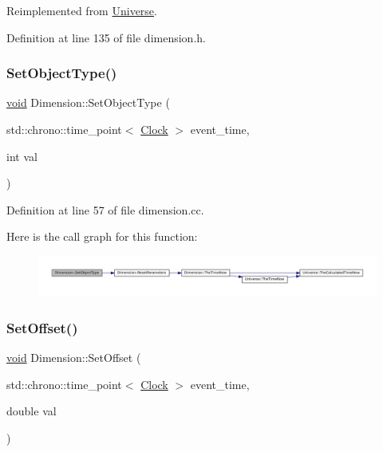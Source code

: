 Reimplemented from \mbox{\hyperlink{class_universe_ae0cb8d86b2fbb8396d605160344b42f5}{Universe}}.



Definition at line 135 of file dimension.\+h.

\mbox{\label{class_dimension_a484621a7c6f9b43f6e251ba04e0fdf8b}} 
\subsubsection{\texorpdfstring{Set\+Object\+Type()}{SetObjectType()}}
{\footnotesize\ttfamily \mbox{\hyperlink{glad_8h_a950fc91edb4504f62f1c577bf4727c29}{void}} Dimension\+::\+Set\+Object\+Type (\begin{DoxyParamCaption}\item[{std\+::chrono\+::time\+\_\+point$<$ \mbox{\hyperlink{universe_8h_a0ef8d951d1ca5ab3cfaf7ab4c7a6fd80}{Clock}} $>$}]{event\+\_\+time,  }\item[{int}]{val }\end{DoxyParamCaption})}



Definition at line 57 of file dimension.\+cc.

Here is the call graph for this function\+:\nopagebreak
\begin{figure}[H]
\begin{center}
\leavevmode
\includegraphics[width=350pt]{class_dimension_a484621a7c6f9b43f6e251ba04e0fdf8b_cgraph}
\end{center}
\end{figure}
\mbox{\label{class_dimension_af74dd7af3af95c0a51b001b6ad665300}} 
\subsubsection{\texorpdfstring{Set\+Offset()}{SetOffset()}}
{\footnotesize\ttfamily \mbox{\hyperlink{glad_8h_a950fc91edb4504f62f1c577bf4727c29}{void}} Dimension\+::\+Set\+Offset (\begin{DoxyParamCaption}\item[{std\+::chrono\+::time\+\_\+point$<$ \mbox{\hyperlink{universe_8h_a0ef8d951d1ca5ab3cfaf7ab4c7a6fd80}{Clock}} $>$}]{event\+\_\+time,  }\item[{double}]{val }\end{DoxyParamCaption})}



